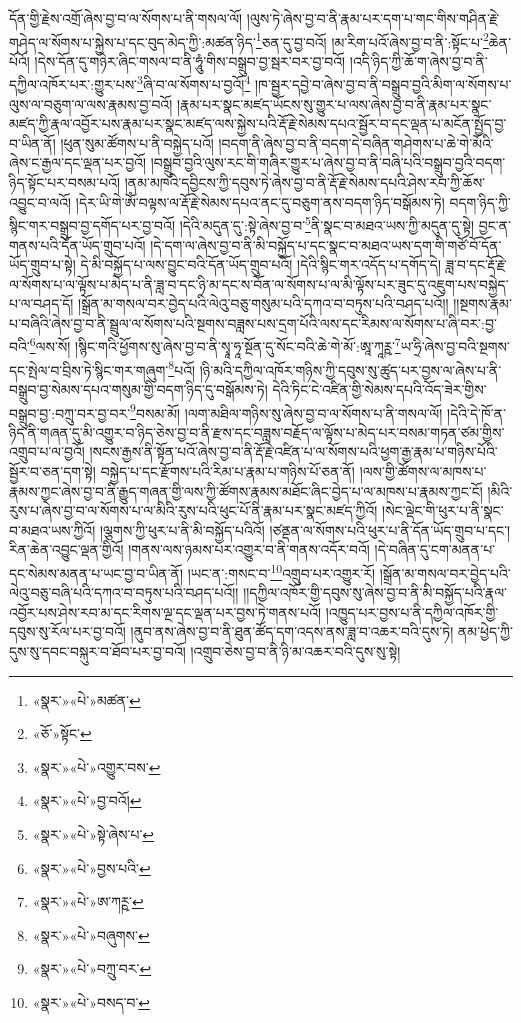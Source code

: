 དོན་གྱི་རྗེས་འགྲོ་ཞེས་བྱ་བ་ལ་སོགས་པ་ནི་གསལ་ལོ། །ལུས་ཏེ་ཞེས་བྱ་བ་ནི་རྣམ་པར་དག་པ་གང་གིས་གཤིན་རྗེ་གཤེད་ལ་སོགས་པ་སྐྱེས་པ་དང་བུད་མེད་ཀྱི་:མཚན་ཉིད་\footnote{«སྣར་»«པེ་»མཚན་}ཅན་དུ་བྱ་བའོ། །མ་རིག་པའོ་ཞེས་བྱ་བ་ནི་:སྟོང་པ་\footnote{«ཅོ་»སྟོང་}ཆེན་པོའོ། །དེས་དོན་དུ་གཉེར་ཞིང་གསལ་བ་ནི་ཧཱུཾ་གིས་བསྒྲུབ་བྱ་སྦར་བར་བྱ་བའོ། །འདི་ཉིད་ཀྱི་ཆོ་ག་ཞེས་བྱ་བ་ནི་དཀྱིལ་འཁོར་པར་:གྱུར་པས་\footnote{«སྣར་»«པེ་»འགྱུར་བས་}ཞི་བ་ལ་སོགས་པ་བྱའོ།\footnote{«སྣར་»«པེ་»བྱ་བའོ།} །ཁ་སྦྱར་དབྱེ་བ་ཞེས་བྱ་བ་ནི་བསྒྲུབ་བྱའི་མིག་ལ་སོགས་པ་ལུས་ལ་བཅུག་ལ་ལས་རྣམས་བྱ་བའོ། །རྣམ་པར་སྣང་མཛད་ཡོངས་སུ་གྱུར་པ་ལས་ཞེས་བྱ་བ་ནི་རྣམ་པར་སྣང་མཛད་ཀྱི་རྣལ་འབྱོར་པས་རྣམ་པར་སྣང་མཛད་ལས་སྐྱེས་པའི་རྡོ་རྗེ་སེམས་དཔའ་སྦྱོར་བ་དང་ལྡན་པ་མངོན་སྤྱོད་བྱ་བ་ཡིན་ནོ། །ཕུན་སུམ་ཚོགས་པ་ནི་བསྐྱེད་པའོ། །བདག་ནི་ཞེས་བྱ་བ་ནི་བདག་དེ་བཞིན་གཤེགས་པ་ཆེ་གེ་མོའི་ཞེས་ང་རྒྱལ་དང་ལྡན་པར་བྱའོ། །བསྒྲུབ་བྱའི་ལུས་རང་གི་གཞིར་གྱུར་པ་ཞེས་བྱ་བ་ནི་བཞི་པའི་བསྒྲུབ་བྱའི་བདག་ཉིད་སྟོང་པར་བསམ་པའོ། །ནམ་མཁའི་དབྱིངས་ཀྱི་དབུས་ཏེ་ཞེས་བྱ་བ་ནི་རྡོ་རྗེ་སེམས་དཔའི་ཤེས་རབ་ཀྱི་ཆོས་འབྱུང་བ་ལའོ། །དེར་ཡི་གེ་ཨོཾ་བལྟས་ལ་རྡོ་རྗེ་སེམས་དཔའ་ནང་དུ་བཅུག་ནས་བདག་ཉིད་བསྒོམས་ཏེ། བདག་ཉིད་ཀྱི་སྙིང་གར་བསྒྲུབ་བྱ་དགོད་པར་བྱ་བའོ། །དེའི་མདུན་དུ་:སྟེ་ཞེས་བྱ་བ་\footnote{«སྣར་»«པེ་»སྟེ་ཞེས་པ་}ནི་སྣང་བ་མཐའ་ཡས་ཀྱི་མདུན་དུ་སྟེ། བྱང་ན་གནས་པའི་དོན་ཡོད་གྲུབ་པའོ། །དེ་དག་ལ་ཞེས་བྱ་བ་ནི་མི་བསྐྱོད་པ་དང་སྣང་བ་མཐའ་ཡས་དག་གི་གཙོ་བོ་དོན་ཡོད་གྲུབ་པ་སྟེ། དེ་མི་བསྐྱོད་པ་ལས་བྱུང་བའི་དོན་ཡོད་གྲུབ་པའོ། །དེའི་སྙིང་གར་འདོད་པ་དགོད་དེ། ཟླ་བ་དང་རྡོ་རྗེ་ལ་སོགས་པ་ལ་ལྟོས་པ་མེད་པ་ནི་ཟླ་བ་དང་ཉི་མ་དང་ས་བོན་ལ་སོགས་པ་ལ་མི་ལྟོས་པར་ཟུང་དུ་འཇུག་པས་བསྐྱེད་པ་ལ་བཤད་དོ། །སྒྲོན་མ་གསལ་བར་བྱེད་པའི་ལེའུ་བཅུ་གསུམ་པའི་དཀའ་བ་བཏུས་པའི་བཤད་པའོ།། །།སྔགས་རྣམ་པ་བཞིའི་ཞེས་བྱ་བ་ནི་སྦྲུལ་ལ་སོགས་པའི་སྔགས་བཟླས་པས་དྲག་པོའི་ལས་དང་རིམས་ལ་སོགས་པ་ཞི་བར་:བྱ་བའི་\footnote{«སྣར་»«པེ་»བྱས་པའི་}ལས་སོ། །སྙིང་གའི་ཕྱོགས་སུ་ཞེས་བྱ་བ་ནི་སྭཱ་ཧཱ་སྔོན་དུ་སོང་བའི་ཆེ་གེ་མོ་:ཨཱ་ཀཱཪྵ་\footnote{«སྣར་»«པེ་»ཨ་ཀཪྵ་}ཡ་ཧྲི་ཞེས་བྱ་བའི་སྔགས་དང་སྤེལ་བ་བྲིས་ཏེ་སྙིང་གར་གཞུག་\footnote{«སྣར་»«པེ་»བཞུགས་}པའོ། །ཉི་མའི་དཀྱིལ་འཁོར་གཉིས་ཀྱི་དབུས་སུ་ཚུད་པར་བྱས་ལ་ཞེས་པ་ནི་བསྒྲུབ་བྱ་སེམས་དཔའ་གསུམ་གྱི་བདག་ཉིད་དུ་བསྒོམས་ཏེ། དེའི་ཏིང་ངེ་འཛིན་གྱི་སེམས་དཔའི་འོད་ཟེར་གྱིས་བསྒྲུབ་བྱ་:བཀྲུ་བར་བྱ་བར་\footnote{«སྣར་»«པེ་»བཀྲུ་བར་}བསམ་མོ། །ལག་མཐིལ་གཉིས་སུ་ཞེས་བྱ་བ་ལ་སོགས་པ་ནི་གསལ་ལོ། །དེའི་དེ་ཁོ་ན་ཉིད་ནི་གཞན་དུ་མི་འགྱུར་བ་ཉིད་ཅེས་བྱ་བ་ནི་རྫས་དང་བཟླས་བརྗོད་ལ་ལྟོས་པ་མེད་པར་བསམ་གཏན་ཙམ་གྱིས་འགྲུབ་པ་ལ་བྱའོ། །སངས་རྒྱས་ནི་སྟོན་པའོ་ཞེས་བྱ་བ་ནི་རྡོ་རྗེ་འཛིན་པ་ལ་སོགས་པའི་ཕྱག་རྒྱ་རྣམ་པ་གཉིས་པོའི་སྦྱོར་བ་ཅན་དག་སྟེ། བསྐྱེད་པ་དང་རྫོགས་པའི་རིམ་པ་རྣམ་པ་གཉིས་པོ་ཅན་ནོ། །ལས་གྱི་ཚོགས་ལ་མཁས་པ་རྣམས་ཀྱང་ཞེས་བྱ་བ་ནི་རྒྱུད་གཞན་གྱི་ལས་ཀྱི་ཚོགས་རྣམས་མཐོང་ཞིང་བྱེད་པ་ལ་མཁས་པ་རྣམས་ཀྱང་ངོ། །མིའི་རུས་པ་ཞེས་བྱ་བ་ལ་སོགས་པ་ལ་མིའི་རུས་པའི་ཕུང་པོ་ནི་རྣམ་པར་སྣང་མཛད་ཀྱིའོ། །སེང་ལྡེང་གི་ཕུར་པ་ནི་སྣང་བ་མཐའ་ཡས་ཀྱིའོ། །ལྕགས་ཀྱི་ཕུར་པ་ནི་མི་བསྐྱོད་པའིའོ། །ཙནྡན་ལ་སོགས་པའི་ཕུར་པ་ནི་དོན་ཡོད་གྲུབ་པ་དང་། རིན་ཆེན་འབྱུང་ལྡན་གྱིའོ། །གནས་ལས་ཉམས་པར་འགྱུར་བ་ནི་གནས་འདོར་བའོ། །དེ་བཞིན་དུ་ངག་མནན་པ་དང་སེམས་མནན་པ་ཡང་བྱ་བ་ཡིན་ནོ། །ཡང་ན་:གསང་བ་\footnote{«སྣར་»«པེ་»བསད་བ་}འགྲུབ་པར་འགྱུར་རོ། །སྒྲོན་མ་གསལ་བར་བྱེད་པའི་ལེའུ་བཅུ་བཞི་པའི་དཀའ་བ་བཏུས་པའི་བཤད་པའོ།། །།དཀྱིལ་འཁོར་གྱི་དབུས་སུ་ཞེས་བྱ་བ་ནི་མི་བསྐྱོད་པའི་རྣལ་འབྱོར་པས་ཤེས་རབ་མ་དང་རིགས་ལྔ་དང་ལྡན་པར་བྱས་ཏེ་གནས་པའོ། །འཁྱུད་པར་བྱས་པ་ནི་དཀྱིལ་འཁོར་གྱི་དབུས་སུ་རོལ་པར་བྱ་བའོ། །ནུབ་ནས་ཞེས་བྱ་བ་ནི་ཐུན་ཚོད་དག་འདས་ནས་ཟླ་བ་འཆར་བའི་དུས་ཏེ། ནམ་ཕྱེད་ཀྱི་དུས་སུ་དབང་བསྐུར་བ་ཐོབ་པར་བྱ་བའོ། །འགྲུབ་ཅེས་བྱ་བ་ནི་ཉི་མ་འཆར་བའི་དུས་སུ་སྟེ། 